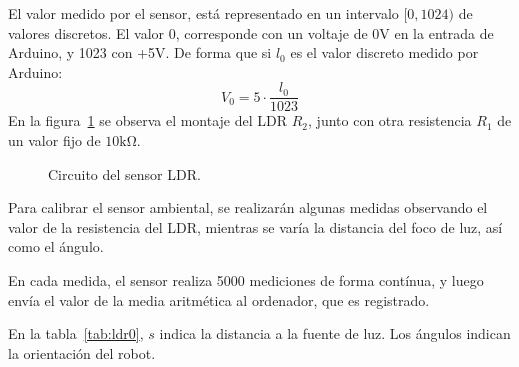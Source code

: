 \documentclass[10pt,a4paper,hidelinks,twocolumn,nobalancelastpage]{article}
\begin{document}
El valor medido por el sensor, está representado en un intervalo $[0, 1024)$ de 
valores discretos. El valor 0, corresponde con un voltaje de 0V en la entrada de 
Arduino, y 1023 con +5V. De forma que si $l_0$ es el valor discreto medido por 
Arduino:
$$ V_0 = 5 \cdot \frac{l_0}{1023} $$
En la figura~\ref{fig:ldr_circuito} se observa el montaje del LDR $R_2$, junto 
con otra resistencia $R_1$ de un valor fijo de $10\si{\kohm}$.

\begin{figure}[h]
\centering
{}
\caption{Circuito del sensor LDR.\label{fig:ldr_circuito}}
\end{figure}

%


Para calibrar el sensor ambiental, se realizarán algunas medidas observando el 
valor de la resistencia del LDR, mientras se varía la distancia del foco de luz, 
así como el ángulo.

En cada medida, el sensor realiza 5000 mediciones de forma contínua, y luego 
envía el valor de la media aritmética al ordenador, que es registrado.

En la tabla~\ref{tab:ldr0}, $s$ indica la distancia a la fuente de luz. Los 
ángulos indican la orientación del robot.
\end{document}
